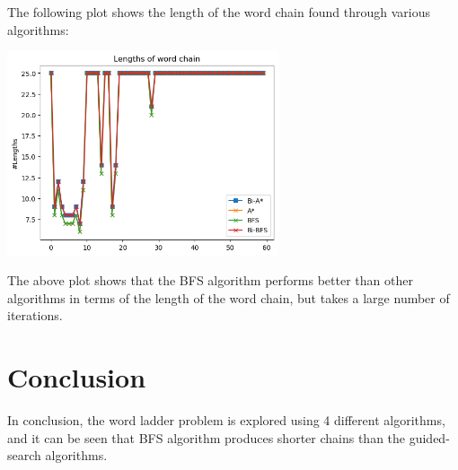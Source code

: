 \documentclass[]{article}
\begin{document}
The following plot shows the length of the word chain found through various algorithms:

\begin{center}
	\includegraphics[width=0.6\textwidth]{images/lengths.png}
\end{center}

The above plot shows that the BFS algorithm performs better than other algorithms in terms of the length of the word chain, but takes a large number of iterations.

\section{Conclusion}

In conclusion, the word ladder problem is explored using 4 different algorithms, and it can be seen that BFS algorithm produces shorter chains than the guided-search algorithms.
\end{document}
